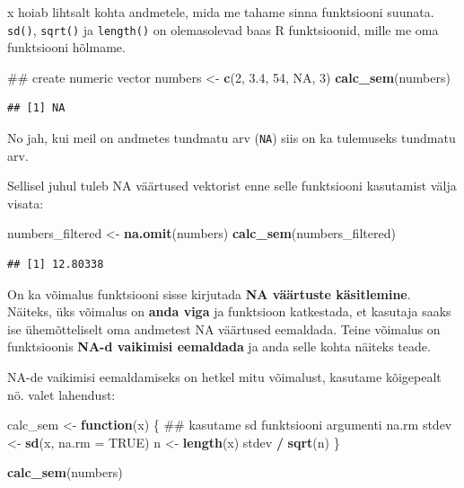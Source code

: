 \documentclass[]{book}
\newenvironment{Shaded}{\begin{snugshade}}{\end{snugshade}}
\newcommand{\KeywordTok}[1]{\textcolor[rgb]{0.13,0.29,0.53}{\textbf{#1}}}
\newcommand{\DataTypeTok}[1]{\textcolor[rgb]{0.13,0.29,0.53}{#1}}
\newcommand{\DecValTok}[1]{\textcolor[rgb]{0.00,0.00,0.81}{#1}}
\newcommand{\FloatTok}[1]{\textcolor[rgb]{0.00,0.00,0.81}{#1}}
\newcommand{\StringTok}[1]{\textcolor[rgb]{0.31,0.60,0.02}{#1}}
\newcommand{\OtherTok}[1]{\textcolor[rgb]{0.56,0.35,0.01}{#1}}
\newcommand{\ControlFlowTok}[1]{\textcolor[rgb]{0.13,0.29,0.53}{\textbf{#1}}}
\newcommand{\OperatorTok}[1]{\textcolor[rgb]{0.81,0.36,0.00}{\textbf{#1}}}
\newcommand{\NormalTok}[1]{#1}
\begin{document}
x hoiab lihtsalt kohta andmetele, mida me tahame sinna funktsiooni
suunata. \texttt{sd()}, \texttt{sqrt()} ja \texttt{length()} on
olemasolevad baas R funktsioonid, mille me oma funktsiooni hõlmame.

\begin{Shaded}
\begin{Highlighting}[]
\NormalTok{## create numeric vector}
\NormalTok{numbers <-}\StringTok{ }\KeywordTok{c}\NormalTok{(}\DecValTok{2}\NormalTok{, }\FloatTok{3.4}\NormalTok{, }\DecValTok{54}\NormalTok{, }\OtherTok{NA}\NormalTok{, }\DecValTok{3}\NormalTok{)}
\KeywordTok{calc_sem}\NormalTok{(numbers)}
\end{Highlighting}
\end{Shaded}

\begin{verbatim}
## [1] NA
\end{verbatim}

No jah, kui meil on andmetes tundmatu arv (\texttt{NA}) siis on ka
tulemuseks tundmatu arv.

Sellisel juhul tuleb NA väärtused vektorist enne selle funktsiooni
kasutamist välja visata:

\begin{Shaded}
\begin{Highlighting}[]
\NormalTok{numbers_filtered <-}\StringTok{ }\KeywordTok{na.omit}\NormalTok{(numbers)}
\KeywordTok{calc_sem}\NormalTok{(numbers_filtered)}
\end{Highlighting}
\end{Shaded}

\begin{verbatim}
## [1] 12.80338
\end{verbatim}

On ka võimalus funktsiooni sisse kirjutada \textbf{NA väärtuste
käsitlemine}. Näiteks, üks võimalus on \textbf{anda viga} ja funktsioon
katkestada, et kasutaja saaks ise ühemõtteliselt oma andmetest NA
väärtused eemaldada. Teine võimalus on funktsioonis \textbf{NA-d
vaikimisi eemaldada} ja anda selle kohta näiteks teade.

NA-de vaikimisi eemaldamiseks on hetkel mitu võimalust, kasutame
kõigepealt nö. valet lahendust:

\begin{Shaded}
\begin{Highlighting}[]
\NormalTok{calc_sem <-}\StringTok{ }\ControlFlowTok{function}\NormalTok{(x) \{}
\NormalTok{  ## kasutame sd funktsiooni argumenti na.rm}
\NormalTok{  stdev <-}\StringTok{ }\KeywordTok{sd}\NormalTok{(x, }\DataTypeTok{na.rm =} \OtherTok{TRUE}\NormalTok{)}
\NormalTok{  n <-}\StringTok{ }\KeywordTok{length}\NormalTok{(x)}
\NormalTok{  stdev }\OperatorTok{/}\StringTok{ }\KeywordTok{sqrt}\NormalTok{(n)}
\NormalTok{\}}

\KeywordTok{calc_sem}\NormalTok{(numbers)}
\end{Highlighting}
\end{Shaded}
\end{document}
